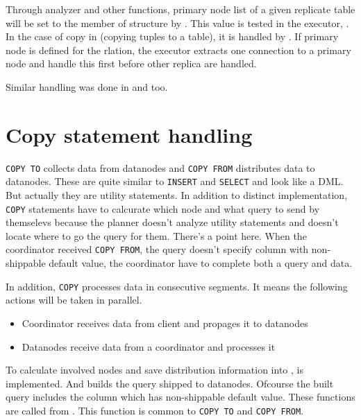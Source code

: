   Through analyzer and other functions, primary node list of a given replicate table will be
  set to the member   of  structure by
  .
  This value is tested in the executor, .
  In the case of copy in (copying tuples to a table), it is handled by .
  If primary node is defined for the rlation, the executor extracts one connection to a primary node and
  handle this first before other replica are handled.

  Similar handling was done in  and
   too.




\section{\label{sec:copy}Copy statement handling}

  \texttt{COPY TO} collects data from datanodes and \texttt{COPY FROM} distributes data to datanodes.
  These are quite similar to \texttt{INSERT} and \texttt{SELECT} and look like a DML.
  But actually they are utility statements.
  In addition to distinct implementation,
  \texttt{COPY} statements have to calcurate which node and what query to send by themselevs
  because the planner doesn't analyze utility statements
  and doesn't locate where to go the query for them.
  There's a point here. When the coordinator received \texttt{COPY FROM},
  the query doesn't specify column with non-shippable default value,
  the coordinator have to complete both a query and data.
  
  In addition, \texttt{COPY} processes data in consecutive segments.
  It means the following actions will be taken in parallel.
  
  \begin{itemize}
    \item Coordinator receives data from client and propages it to datanodes
    \item Datanodes receive data from a coordinator and processes it
  \end{itemize}
  
  To calculate involved nodes and save distribution information into ,
    is implemented.
  And  builds the query shipped to datanodes.
  Ofcourse the built query includes the column which has non-shippable default value.
  These functions are called from .
  This function is common to \texttt{COPY TO} and \texttt{COPY FROM}.
  
